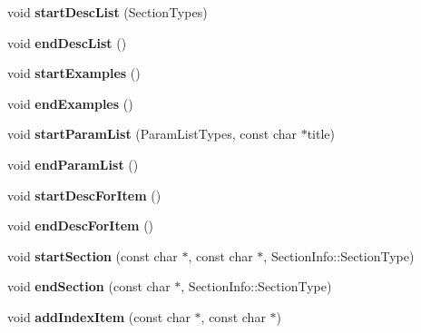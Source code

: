 \begin{DoxyCompactItemize}
\item 
\mbox{\label{class_man_generator_a8aef21e6f671eda52e22a3941954fbc1}} 
void {\bfseries start\+Desc\+List} (Section\+Types)
\item 
\mbox{\label{class_man_generator_aa30427fbbe13113b3fe39bebfe79d1ee}} 
void {\bfseries end\+Desc\+List} ()
\item 
\mbox{\label{class_man_generator_a0de8bc4d17093fbfb77c00bef2a66181}} 
void {\bfseries start\+Examples} ()
\item 
\mbox{\label{class_man_generator_a560e1a3d4a48b04d9f214051c9bb680c}} 
void {\bfseries end\+Examples} ()
\item 
\mbox{\label{class_man_generator_a12ce892150a512ed5803e90ad684dd0a}} 
void {\bfseries start\+Param\+List} (Param\+List\+Types, const char $\ast$title)
\item 
\mbox{\label{class_man_generator_a08de61d7842d7920e0cffe03213f31fb}} 
void {\bfseries end\+Param\+List} ()
\item 
\mbox{\label{class_man_generator_ae826d6dc94da45c9b35bb715ab316656}} 
void {\bfseries start\+Desc\+For\+Item} ()
\item 
\mbox{\label{class_man_generator_a0729f8d1cc066dd6629a0c7bd765bc81}} 
void {\bfseries end\+Desc\+For\+Item} ()
\item 
\mbox{\label{class_man_generator_ad22a90e2eed1e0487fb500674e004e91}} 
void {\bfseries start\+Section} (const char $\ast$, const char $\ast$, Section\+Info\+::\+Section\+Type)
\item 
\mbox{\label{class_man_generator_a08b9cad6ac2d759823224b4580c77fd3}} 
void {\bfseries end\+Section} (const char $\ast$, Section\+Info\+::\+Section\+Type)
\item 
\mbox{\label{class_man_generator_a290636c8090c771e5fd94e35cce35248}} 
void {\bfseries add\+Index\+Item} (const char $\ast$, const char $\ast$)

\end{DoxyCompactItemize}
